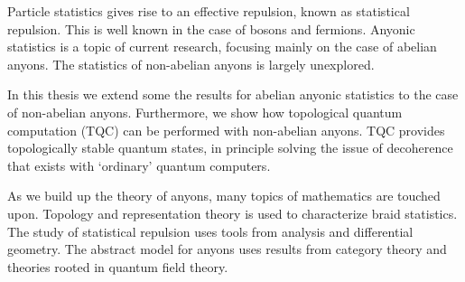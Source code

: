 Particle statistics gives rise to an effective repulsion, known as statistical repulsion. This is well known in the case of bosons and fermions. Anyonic statistics is a topic of current research, focusing mainly on the case of abelian anyons. The statistics of non-abelian anyons is largely unexplored.

In this thesis we extend some the results for abelian anyonic statistics to the case of non-abelian anyons. Furthermore, we show how topological quantum computation (TQC) can be performed with non-abelian anyons. TQC provides topologically stable quantum states, in principle solving the issue of decoherence that exists with `ordinary' quantum computers.

As we build up the theory of anyons, many topics of mathematics are touched upon. Topology and representation theory is used to characterize braid statistics. The study of statistical repulsion uses tools from analysis and differential geometry. The abstract model for anyons uses results from category theory and theories rooted in quantum field theory.
